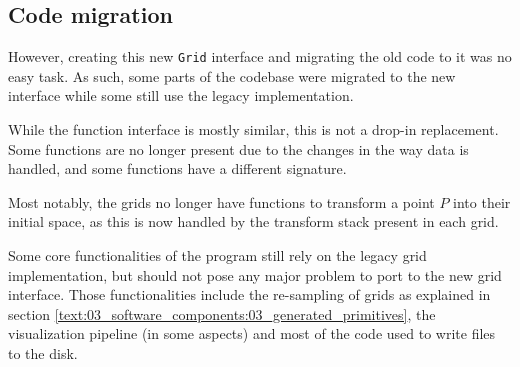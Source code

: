 {	\subsection{Code migration}\label{text:03_software_components:01_image_representation:03_migration}
	{
		However, creating this new \texttt{Grid} interface and migrating the old code to it was no easy task. As such, some parts of the codebase were migrated to the new interface while some still use the legacy implementation.\par
		While the function interface is mostly similar, this is not a drop-in replacement. Some functions are no longer present due to the changes in the way data is handled, and some functions have a different signature.\par
		Most notably, the grids no longer have functions to transform a point $P$ into their initial space, as this is now handled by the transform stack present in each grid.\par
		\myparspace
		Some core functionalities of the program still rely on the legacy grid implementation, but should not pose any major problem to port to the new grid interface. Those functionalities include the re-sampling of grids as explained in section \ref{text:03_software_components:03_generated_primitives}, the visualization pipeline (in some aspects) and most of the code used to write files to the disk.
	}
}

